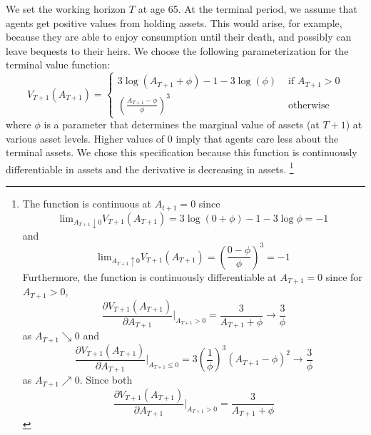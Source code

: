 \documentclass{article}
\begin{document}
We set the working horizon $T$ at age 65. At the terminal period, we assume that agents get positive values from holding assets. This would arise, for example, because they are able to enjoy consumption until their death, and possibly can leave bequests to their heirs. We choose the following parameterization for the terminal value function:
\begin{equation} \tag{8}
  V_{T+1}(A_{T+1}) = \begin{cases}
        3 \log(A_{T+1} + \phi) - 1 - 3 \log(\phi) & \mbox{ if $A_{T+1}>0$}\\
        (\frac{A_{T+1}-\phi}{\phi})^3 & \mbox{ otherwise}
            \end{cases}
          \end{equation}
          where $\phi$ is a parameter that determines the marginal value of assets (at $T + 1$) at various asset levels. Higher values of 0 imply that agents care less about the terminal assets. We chose this specification because this function is continuously differentiable in assets and the derivative is decreasing in assets. \footnote[7]{The function is continuous at $A_{t+1}=0$ since
            \begin{equation*}
              \text{lim}_{A_{T+1} \downarrow 0} V_{T+1} (A_{T+1}) = 3 \log(0 + \phi) - 1 - 3 \log \phi = -1
            \end{equation*}
            and
            \begin{equation*}
              \text{lim}_{A_{T+1} \uparrow 0} V_{T+1} (A_{T+1}) = (\dfrac{0-\phi}{\phi})^3 = -1
            \end{equation*}
            Furthermore, the function is continuously differentiable at $A_{T+1}=0$ since for $A_{T+1}>0$,
            \begin{equation*}
             \dfrac{\partial V_{T+1} (A_{T+1})}{\partial A_{T+1}}|_{A_{T+1}>0} = \dfrac{3}{A_{T+1}+\phi} \to \frac{3}{\phi}
           \end{equation*}
           as $A_{T+1} \searrow 0$ and
           \begin{equation*}
             \dfrac{\partial V_{T+1} (A_{T+1})}{\partial A_{T+1}}|_{A_{T+1} \leq 0} = 3 (\frac{1}{\phi})^3(A_{T+1}-\phi)^2 \to \frac{3}{\phi}
           \end{equation*}
           as $A_{T+1} \nearrow 0$. Since both
           \begin{equation*}
             \dfrac{\partial V_{T+1} (A_{T+1})}{\partial A_{T+1}}|_{A_{T+1}>0} = \dfrac{3}{A_{T+1}+\phi}
           \end{equation*}
}
\end{document}
